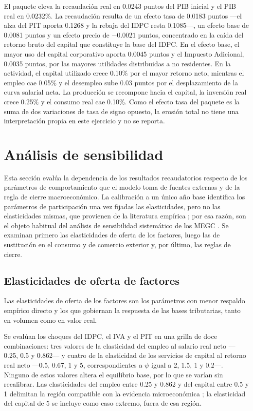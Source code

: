 \documentclass[11pt]{article}
\begin{document}
El paquete eleva la recaudación real en 0.0243 puntos del PIB inicial y el PIB real en 0.0232\%. La recaudación resulta de un efecto tasa de 0.0183 puntos ---el alza del PIT aporta 0.1268 y la rebaja del IDPC resta 0.1085---, un efecto base de 0.0081 puntos y un efecto precio de $-0.0021$ puntos, concentrado en la caída del retorno bruto del capital que constituye la base del IDPC. En el efecto base, el mayor uso del capital corporativo aporta 0.0045 puntos y el Impuesto Adicional, 0.0035 puntos, por las mayores utilidades distribuidas a no residentes. En la actividad, el capital utilizado crece 0.10\% por el mayor retorno neto, mientras el empleo cae 0.05\% y el desempleo sube 0.03 puntos por el desplazamiento de la curva salarial neta. La producción se recompone hacia el capital, la inversión real crece 0.25\% y el consumo real cae 0.10\%. Como el efecto tasa del paquete es la suma de dos variaciones de tasa de signo opuesto, la erosión total no tiene una interpretación propia en este ejercicio y no se reporta.

\section{Análisis de sensibilidad}
\label{sec:sensibilidad}

Esta sección evalúa la dependencia de los resultados recaudatorios respecto de los parámetros de comportamiento que el modelo toma de fuentes externas y de la regla de cierre macroeconómico. La calibración a un único año base identifica los parámetros de participación una vez fijadas las elasticidades, pero no las elasticidades mismas, que provienen de la literatura empírica \cite{mansur_whalley_1984,dawkins_etal_2001}; por esa razón, son el objeto habitual del análisis de sensibilidad sistemático de los MEGC \cite{harrison_vinod_1992}. Se examinan primero las elasticidades de oferta de los factores, luego las de sustitución en el consumo y de comercio exterior y, por último, las reglas de cierre.

\subsection{Elasticidades de oferta de factores}
\label{sec:sens-factores}

Las elasticidades de oferta de los factores son los parámetros con menor respaldo empírico directo y los que gobiernan la respuesta de las bases tributarias, tanto en volumen como en valor real.

Se evalúan los choques del IDPC, el IVA y el PIT en una grilla de doce combinaciones: tres valores de la elasticidad del empleo al salario real neto ---0.25, 0.5 y 0.862--- y cuatro de la elasticidad de los servicios de capital al retorno real neto ---0.5, 0.67, 1 y 5, correspondientes a $\psi$ igual a 2, 1.5, 1 y 0.2---. Ninguno de estos valores altera el equilibrio base, por lo que se varían sin recalibrar. Las elasticidades del empleo entre 0.25 y 0.862 y del capital entre 0.5 y 1 delimitan la región compatible con la evidencia microeconómica \cite{chetty_etal_2011,chetty_2012,hassett_hubbard_2002}; la elasticidad del capital de 5 se incluye como caso extremo, fuera de esa región.
\end{document}
